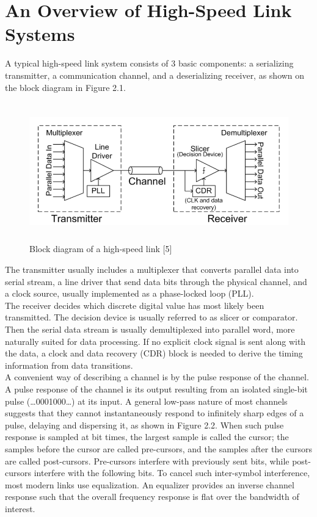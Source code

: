 
\chapter{An Overview of High-Speed Link Systems}
\graphicspath{{An Overview of High-Speed Link Systems/Vector/}{An Overview of High-Speed Link Systems/}}

A typical high-speed link system consists of 3 basic components: a 
serializing transmitter, a communication channel, and a deserializing receiver, as 
shown on the block diagram in Figure 2.1.

\begin{figure}
	\centering
	\includegraphics[width=14cm,height=6cm]{fig2_1.png}
	\caption{Block diagram of a high-speed link [5]}
	\label{high_sp_bl_diag}
\end{figure}

The transmitter usually includes a multiplexer that converts parallel 
data into serial stream, a line driver that send data bits through the physical channel, 
and a clock source, usually implemented as a phase-locked loop (PLL). \\
The receiver decides which discrete digital value has most likely been 
transmitted. The decision device is usually referred to as slicer or comparator. Then 
the serial data stream is usually demultiplexed into parallel word, more naturally 
suited for data processing. If no explicit clock signal is sent along with the data, a clock and data recovery (CDR) block is needed to derive the timing information 
from data transitions.\\

A convenient way of describing a channel is by the pulse response of the channel. A pulse response of the channel is its output resulting from 
an isolated single-bit pulse (…0001000…) at its input. A general low-pass nature of 
most channels suggests that they cannot instantaneously respond to infinitely sharp 
edges of a pulse, delaying and dispersing it, as shown in Figure 2.2. When such pulse 
response is sampled at bit times, the largest sample is called the cursor; the samples 
before the cursor are called pre-cursors, and the samples after the cursors are called post-cursors. Pre-cursors interfere with previously sent bits, while post-cursors 
interfere with the following bits. To cancel such inter-symbol interference, most 
modern links use equalization. An equalizer provides an inverse channel response 
such that the overall frequency response is flat over the bandwidth of interest.


